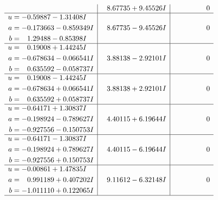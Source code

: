 \documentclass[1p]{elsarticle_modified}
\theoremstyle{definition}
\begin{document}
$$\begin{array}{c|c|c}
 & \phantom{-}8.67735 + 9.45526 I & \phantom{-0.000000 } 0 \\ \hline\begin{aligned}
u &= -0.59887 - 1.31408 I \\
a &= -0.173663 - 0.859349 I \\
b &= \phantom{-}1.29488 - 0.85398 I\end{aligned}
 & \phantom{-}8.67735 - 9.45526 I & \phantom{-0.000000 } 0 \\ \hline\begin{aligned}
u &= \phantom{-}0.19008 + 1.44245 I \\
a &= -0.678634 - 0.066541 I \\
b &= \phantom{-}0.635592 - 0.058737 I\end{aligned}
 & \phantom{-}3.88138 - 2.92101 I & \phantom{-0.000000 } 0 \\ \hline\begin{aligned}
u &= \phantom{-}0.19008 - 1.44245 I \\
a &= -0.678634 + 0.066541 I \\
b &= \phantom{-}0.635592 + 0.058737 I\end{aligned}
 & \phantom{-}3.88138 + 2.92101 I & \phantom{-0.000000 } 0 \\ \hline\begin{aligned}
u &= -0.64171 + 1.30837 I \\
a &= -0.198924 - 0.789627 I \\
b &= -0.927556 - 0.150753 I\end{aligned}
 & \phantom{-}4.40115 + 6.19644 I & \phantom{-0.000000 } 0 \\ \hline\begin{aligned}
u &= -0.64171 - 1.30837 I \\
a &= -0.198924 + 0.789627 I \\
b &= -0.927556 + 0.150753 I\end{aligned}
 & \phantom{-}4.40115 - 6.19644 I & \phantom{-0.000000 } 0 \\ \hline\begin{aligned}
u &= -0.00861 + 1.47835 I \\
a &= \phantom{-}0.991189 + 0.407202 I \\
b &= -1.011110 + 0.122065 I\end{aligned}
 & \phantom{-}9.11612 - 6.32148 I & \phantom{-0.000000 } 0\\
 \hline 
 \end{array}$$\newpage$$\begin{array}{c|c|c}  

\end{array}$$
\end{document}
